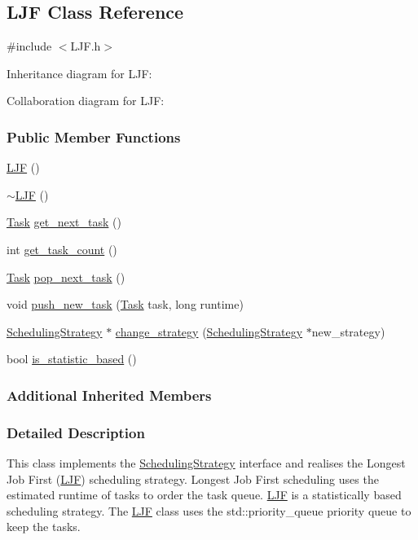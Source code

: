 \hypertarget{a00024}{}\subsection{L\+J\+F Class Reference}
\label{a00024}


{\ttfamily \#include $<$L\+J\+F.\+h$>$}



Inheritance diagram for L\+J\+F\+:


Collaboration diagram for L\+J\+F\+:
\subsubsection*{Public Member Functions}
\begin{DoxyCompactItemize}
\item 
\hyperlink{a00024_ae8c4fa391d8767a5fba0bfb3ad3da8db}{L\+J\+F} ()
\item 
\hyperlink{a00024_a5ad18e75f4069623320bc72e3ec6e4ce}{$\sim$\+L\+J\+F} ()
\item 
\hyperlink{a00002}{Task} \hyperlink{a00024_a24a4c6bfba65ef98753242c1f068b9fd}{get\+\_\+next\+\_\+task} ()
\item 
int \hyperlink{a00024_a329055147464eb68940c0541aba5946e}{get\+\_\+task\+\_\+count} ()
\item 
\hyperlink{a00002}{Task} \hyperlink{a00024_af12a29f8a65fea1de0a2f436fd2b8b2b}{pop\+\_\+next\+\_\+task} ()
\item 
void \hyperlink{a00024_a4661c55d31322bc7755227890ca8679c}{push\+\_\+new\+\_\+task} (\hyperlink{a00002}{Task} task, long runtime)
\item 
\hyperlink{a00033}{Scheduling\+Strategy} $\ast$ \hyperlink{a00024_aaf5029dba4a8200d49f9b6bd47e71acd}{change\+\_\+strategy} (\hyperlink{a00033}{Scheduling\+Strategy} $\ast$new\+\_\+strategy)
\item 
bool \hyperlink{a00024_a9292614934e9dc35f7c4ea568bcdcd4c}{is\+\_\+statistic\+\_\+based} ()
\end{DoxyCompactItemize}
\subsubsection*{Additional Inherited Members}


\subsubsection{Detailed Description}
This class implements the \hyperlink{a00033}{Scheduling\+Strategy} interface and realises the Longest Job First (\hyperlink{a00024}{L\+J\+F}) scheduling strategy. Longest Job First scheduling uses the estimated runtime of tasks to order the task queue. \hyperlink{a00024}{L\+J\+F} is a statistically based scheduling strategy. The \hyperlink{a00024}{L\+J\+F} class uses the std\+::priority\+\_\+queue priority queue to keep the tasks.

